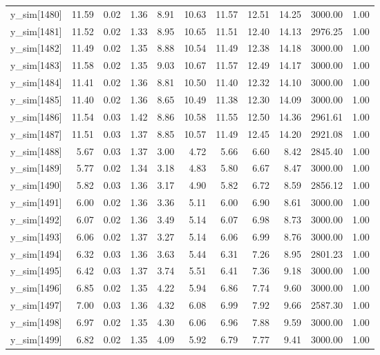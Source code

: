\begin{table}[ht]
\begin{tabular}{rrrrrrrrrrr}
  y\_sim[1480] & 11.59 & 0.02 & 1.36 & 8.91 & 10.63 & 11.57 & 12.51 & 14.25 & 3000.00 & 1.00 \\ 
  y\_sim[1481] & 11.52 & 0.02 & 1.33 & 8.95 & 10.65 & 11.51 & 12.40 & 14.13 & 2976.25 & 1.00 \\ 
  y\_sim[1482] & 11.49 & 0.02 & 1.35 & 8.88 & 10.54 & 11.49 & 12.38 & 14.18 & 3000.00 & 1.00 \\ 
  y\_sim[1483] & 11.58 & 0.02 & 1.35 & 9.03 & 10.67 & 11.57 & 12.49 & 14.17 & 3000.00 & 1.00 \\ 
  y\_sim[1484] & 11.41 & 0.02 & 1.36 & 8.81 & 10.50 & 11.40 & 12.32 & 14.10 & 3000.00 & 1.00 \\ 
  y\_sim[1485] & 11.40 & 0.02 & 1.36 & 8.65 & 10.49 & 11.38 & 12.30 & 14.09 & 3000.00 & 1.00 \\ 
  y\_sim[1486] & 11.54 & 0.03 & 1.42 & 8.86 & 10.58 & 11.55 & 12.50 & 14.36 & 2961.61 & 1.00 \\ 
  y\_sim[1487] & 11.51 & 0.03 & 1.37 & 8.85 & 10.57 & 11.49 & 12.45 & 14.20 & 2921.08 & 1.00 \\ 
  y\_sim[1488] & 5.67 & 0.03 & 1.37 & 3.00 & 4.72 & 5.66 & 6.60 & 8.42 & 2845.40 & 1.00 \\ 
  y\_sim[1489] & 5.77 & 0.02 & 1.34 & 3.18 & 4.83 & 5.80 & 6.67 & 8.47 & 3000.00 & 1.00 \\ 
  y\_sim[1490] & 5.82 & 0.03 & 1.36 & 3.17 & 4.90 & 5.82 & 6.72 & 8.59 & 2856.12 & 1.00 \\ 
  y\_sim[1491] & 6.00 & 0.02 & 1.36 & 3.36 & 5.11 & 6.00 & 6.90 & 8.61 & 3000.00 & 1.00 \\ 
  y\_sim[1492] & 6.07 & 0.02 & 1.36 & 3.49 & 5.14 & 6.07 & 6.98 & 8.73 & 3000.00 & 1.00 \\ 
  y\_sim[1493] & 6.06 & 0.02 & 1.37 & 3.27 & 5.14 & 6.06 & 6.99 & 8.76 & 3000.00 & 1.00 \\ 
  y\_sim[1494] & 6.32 & 0.03 & 1.36 & 3.63 & 5.44 & 6.31 & 7.26 & 8.95 & 2801.23 & 1.00 \\ 
  y\_sim[1495] & 6.42 & 0.03 & 1.37 & 3.74 & 5.51 & 6.41 & 7.36 & 9.18 & 3000.00 & 1.00 \\ 
  y\_sim[1496] & 6.85 & 0.02 & 1.35 & 4.22 & 5.94 & 6.86 & 7.74 & 9.60 & 3000.00 & 1.00 \\ 
  y\_sim[1497] & 7.00 & 0.03 & 1.36 & 4.32 & 6.08 & 6.99 & 7.92 & 9.66 & 2587.30 & 1.00 \\ 
  y\_sim[1498] & 6.97 & 0.02 & 1.35 & 4.30 & 6.06 & 6.96 & 7.88 & 9.59 & 3000.00 & 1.00 \\ 
  y\_sim[1499] & 6.82 & 0.02 & 1.35 & 4.09 & 5.92 & 6.79 & 7.77 & 9.41 & 3000.00 & 1.00 \\ 

\end{tabular}
\end{table}
